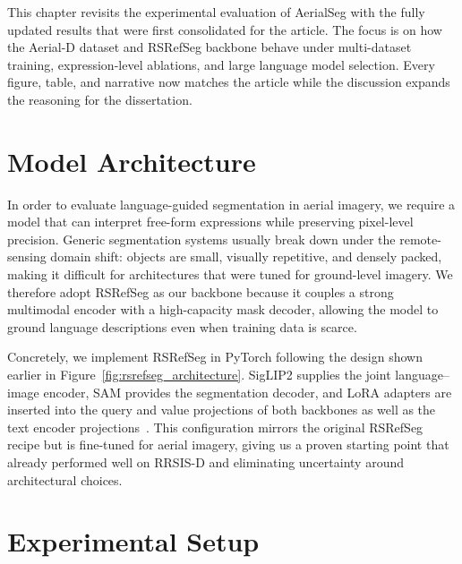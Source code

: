 \cleardoublepage
\label{chap:evaluation}

This chapter revisits the experimental evaluation of AerialSeg with the fully updated results that were first consolidated for the article. The focus is on how the Aerial-D dataset and RSRefSeg backbone behave under multi-dataset training, expression-level ablations, and large language model selection. Every figure, table, and narrative now matches the article while the discussion expands the reasoning for the dissertation.

\section{Model Architecture}

In order to evaluate language-guided segmentation in aerial imagery, we require a model that can interpret free-form expressions while preserving pixel-level precision. Generic segmentation systems usually break down under the remote-sensing domain shift: objects are small, visually repetitive, and densely packed, making it difficult for architectures that were tuned for ground-level imagery. We therefore adopt RSRefSeg as our backbone because it couples a strong multimodal encoder with a high-capacity mask decoder, allowing the model to ground language descriptions even when training data is scarce.

Concretely, we implement RSRefSeg in PyTorch following the design shown earlier in Figure~\ref{fig:rsrefseg_architecture}. SigLIP2 supplies the joint language--image encoder, SAM provides the segmentation decoder, and LoRA adapters are inserted into the query and value projections of both backbones as well as the text encoder projections~\cite{siglip2,sam,lora,chen2025rsrefseg}. This configuration mirrors the original RSRefSeg recipe but is fine-tuned for aerial imagery, giving us a proven starting point that already performed well on RRSIS-D and eliminating uncertainty around architectural choices.

\section{Experimental Setup}


